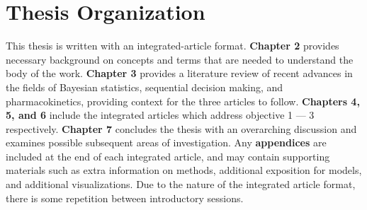 
\section{Thesis Organization}

This thesis is written with an integrated-article format.  \textbf{Chapter 2} provides necessary background on  concepts and terms that are needed to understand the body of the work.  \textbf{Chapter 3} provides a literature review of recent advances in the fields of Bayesian statistics, sequential decision making, and pharmacokinetics, providing context for the three articles to follow.  \textbf{Chapters 4, 5, and 6} include the integrated articles which address objective 1 --- 3 respectively.  \textbf{Chapter 7} concludes the thesis with an overarching discussion and examines possible subsequent areas of investigation.  Any \textbf{appendices} are included at the end of each integrated article, and may contain supporting materials such as extra information on methods, additional exposition for models, and additional visualizations.  Due to the nature of the integrated article format, there is some repetition between introductory sessions.